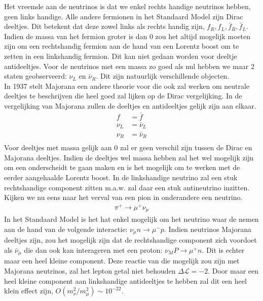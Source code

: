\documentclass[../main.tex]{subfiles}
\begin{document}
Het vreemde aan de neutrinos is dat we enkel rechts handige neutrinos hebben, geen links handige. Alle andere fermionen in het Standaard Model zijn Dirac deeltjes. Dit betekent dat deze zowel links als rechts handig zijn, $f_{R}, f_{L}, \bar{f}_{R}, \bar{f}_{L}$. Indien de massa van het fermion groter is dan 0 zou het altijd mogelijk moeten zijn om een rechtshandig fermion aan de hand van een Lorentz boost om te zetten in een linkshandig fermion. Dit kan niet gedaan worden voor deeltje antideeltjes. Voor de neutrinos met een massa zo goed als nul hebben we maar 2 staten geobserveerd: $\nu_L$ en $\bar{\nu}_R$. Dit zijn natuurlijk verschillende objecten.\\
In 1937 stelt Majorana een andere theorie voor die ook zal werken om neutrale deeltjes te beschrijven die heel goed zal lijken op de Dirac vergelijking. In de vergelijking van Majorana zullen de deeltjes en antideeltjes gelijk zijn aan elkaar.
\begin{equation}
    \begin{aligned}
        \label{eq:majorana_deeltjes}
        f &= \bar{f}\\
        \nu_L &= \bar{\nu}_L\\
        \nu_R &= \bar{\nu}_R\\
    \end{aligned}
\end{equation}
Voor deeltjes met massa gelijk aan 0 zal er geen verschil zijn tussen de Dirac en Majorana deeltjes. Indien de deeltjes wel massa hebben zal het wel mogelijk zijn om een onderscheidt te gaan maken en is het mogelijk om te werken met de eerder aangehaalde Lorentz boost. In de linkshandige neutrino zal een stuk rechtshandige component zitten m.a.w. zal daar een stuk antineutrino inzitten.\\
Kijken we nu eens naar het verval van een pion in onderandere een neutrino.
\begin{equation}
    \begin{aligned}
        \label{eq:pion_neutrino_verval}
        \pi^{+} \rightarrow \mu^{+} \nu_{\mu}
    \end{aligned}
\end{equation}
In het Standaard Model is het hat enkel mogelijk om het neutrino waar de nemen aan de hand van de volgende interactie: $\nu_{\mu} n \rightarrow \mu^{-} p$. Indien neutrinos Majorana deeltjes zijn, zou het mogelijk zijn dat de rechtshandige component zich voordoet als $\bar{\nu}_\mu$ die dan ook kan interageren met een proton: $\nu_M P \longrightarrow \mu^{+} n$. Dit is echter maar een heel kleine component. Deze reactie van die mogelijk zou zijn met Majorana neutrinos, zal het lepton getal niet behouden $\Delta \mathcal{L}=-2$. Door maar een heel kleine component aan linkshandige antideeltjes te hebben zal dit een heel klein effect zijn, $O\left(m_{\nu}^{2} / m_{\mu}^{2}\right) \sim 10^{-22}$.
\end{document}

